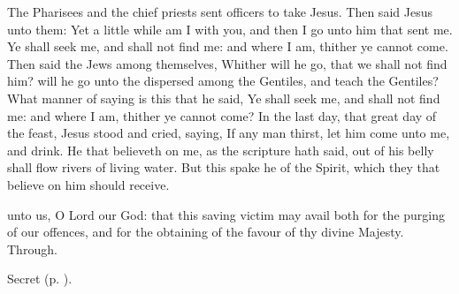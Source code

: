 
\vspace{-0.25\baselineskip}


\vspace{-0.08\baselineskip}

 The Pharisees and the chief priests sent officers to take Jesus. Then said Jesus unto them: Yet a little while am I with you, and then I go unto him that sent me. Ye shall seek me, and shall not find me: and where I am, thither ye cannot come. Then said the Jews among themselves, Whither will he go, that we shall not find him? will he go unto the dispersed among the Gentiles, and teach the Gentiles? What manner of saying is this that he said, Ye shall seek me, and shall not find me: and where I am, thither ye cannot come? In the last day, that great day of the feast, Jesus stood and cried, saying, If any man thirst, let him come unto me, and drink. He that believeth on me, as the scripture hath said, out of his belly shall flow rivers of living water. But this spake he of the Spirit, which they that believe on him should receive.


\vspace{-0.25\baselineskip}

\secret

\vspace{-0.09\baselineskip}

 unto us, O Lord our God: that this saving victim may avail both for the purging of our offences, and for the obtaining of the favour of thy divine Majesty. Through.
\begin{rubric}
     Secret  (p. \pageref{AshWednesdayMassSecret}).
\end{rubric}

